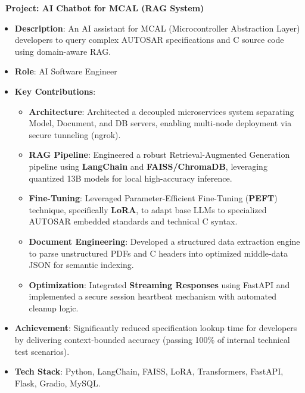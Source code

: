 \documentclass[letterpaper,10pt]{article}
\newenvironment{resume_list}{
  \vspace{-7pt}
  \begin{itemize}[itemsep=-2px, parsep=1pt, leftmargin=30pt]
}{
  \end{itemize}
}
\begin{document}
\begin{resume_list}
 
      \item \textbf{\faRobot\ Project: AI Chatbot for MCAL (RAG System)}
        \begin{itemize}[itemsep=1pt, leftmargin=15pt, label=-]
          \item \textbf{Description}: An AI assistant for MCAL (Microcontroller Abstraction Layer) developers to query complex AUTOSAR specifications and C source code using domain-aware RAG.
          \item \textbf{Role}: AI Software Engineer
          \item \textbf{Key Contributions}:
             \begin{itemize}[itemsep=0pt, leftmargin=10pt, label=$\circ$]
               \item \textbf{Architecture}: Architected a decoupled microservices system separating Model, Document, and DB servers, enabling multi-node deployment via secure tunneling (ngrok).
               \item \textbf{RAG Pipeline}: Engineered a robust Retrieval-Augmented Generation pipeline using \textbf{LangChain} and \textbf{FAISS/ChromaDB}, leveraging quantized 13B models for local high-accuracy inference.
               \item \textbf{Fine-Tuning}: Leveraged Parameter-Efficient Fine-Tuning (\textbf{PEFT}) technique, specifically \textbf{LoRA}, to adapt base LLMs to specialized AUTOSAR embedded standards and technical C syntax.
               \item \textbf{Document Engineering}: Developed a structured data extraction engine to parse unstructured PDFs and C headers into optimized middle-data JSON for semantic indexing.
               \item \textbf{Optimization}: Integrated \textbf{Streaming Responses} using FastAPI and implemented a secure session heartbeat mechanism with automated cleanup logic.
             \end{itemize}
          \item \textbf{Achievement}: Significantly reduced specification lookup time for developers by delivering context-bounded accuracy (passing 100\% of internal technical test scenarios).
          \item \textbf{Tech Stack}: Python, LangChain, FAISS, LoRA, Transformers, FastAPI, Flask, Gradio, MySQL.
        \end{itemize}
   \end{resume_list}
 
\end{document}

